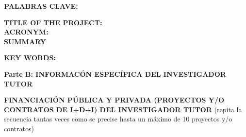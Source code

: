 \documentclass[a4paper,11pt,oneside]{article}
\begin{document}
\noindent\textbf{PALABRAS CLAVE:}\\
\vspace{12pt}

\noindent\textbf{TITLE OF THE PROJECT:}\\
\textbf{ACRONYM:}\\
\textbf{SUMMARY} {\color{blue}{Maximum 3500 characters (including spaces):}}
\vspace{12pt}

\noindent\textbf{KEY WORDS:}\\
\vspace{12pt}

\newpage
\setcounter{page}{1}

\begin{tcolorbox}[colback=yellow,arc=0pt,outer arc=0pt,colframe=black,boxrule=0.6pt,left=0mm]
  \textbf{Parte B: INFORMAC\'ON ESPEC\'IFICA DEL INVESTIGADOR TUTOR}
\end{tcolorbox}

\textbf{FINANCIACI\'ON P\'UBLICA Y PRIVADA (PROYECTOS Y/O CONTRATOS DE I+D+I) DEL INVESTIGADOR TUTOR} (repita la secuencia tantas veces como se precise hasta un máximo de 10 proyectos y/o contratos)
\end{document}
